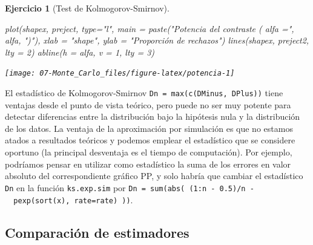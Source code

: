 \documentclass[
]{book}
\newenvironment{Shaded}{\begin{snugshade}}{\end{snugshade}}
\newcommand{\AttributeTok}[1]{\textcolor[rgb]{0.77,0.63,0.00}{#1}}
\newcommand{\DecValTok}[1]{\textcolor[rgb]{0.00,0.00,0.81}{#1}}
\newcommand{\FunctionTok}[1]{\textcolor[rgb]{0.00,0.00,0.00}{#1}}
\newcommand{\NormalTok}[1]{#1}
\newcommand{\StringTok}[1]{\textcolor[rgb]{0.31,0.60,0.02}{#1}}
\theoremstyle{break}
\newtheorem{exercise}{Ejercicio}[chapter]
\theoremstyle{nonumberplain}
\begin{document}
\begin{exercise}[Test de Kolmogorov-Smirnov]
\begin{enumerate}
\begin{Shaded}
\begin{Highlighting}[]
\FunctionTok{plot}\NormalTok{(shapex, preject, }\AttributeTok{type=}\StringTok{"l"}\NormalTok{, }\AttributeTok{main =} \FunctionTok{paste}\NormalTok{(}\StringTok{"Potencia del contraste ( alfa ="}\NormalTok{, alfa, }\StringTok{")"}\NormalTok{), }
     \AttributeTok{xlab =} \StringTok{"shape"}\NormalTok{, }\AttributeTok{ylab =} \StringTok{"Proporción de rechazos"}\NormalTok{)}
\FunctionTok{lines}\NormalTok{(shapex, preject2, }\AttributeTok{lty =} \DecValTok{2}\NormalTok{)}
\FunctionTok{abline}\NormalTok{(}\AttributeTok{h =}\NormalTok{ alfa, }\AttributeTok{v =} \DecValTok{1}\NormalTok{, }\AttributeTok{lty =} \DecValTok{3}\NormalTok{)}
\end{Highlighting}
\end{Shaded}

  \begin{center}\texttt{[image: 07-Monte\_Carlo\_files/figure-latex/potencia-1]} \end{center}
\end{enumerate}

\end{exercise}

El estadístico de Kolmogorov-Smirnov \texttt{Dn\ =\ max(c(DMinus,\ DPlus))} tiene ventajas desde el
punto de vista teórico, pero puede no ser muy potente para detectar diferencias entre la
distribución bajo la hipótesis nula y la distribución de los datos.
La ventaja de la aproximación por simulación es que no estamos atados a resultados teóricos
y podemos emplear el estadístico que se considere oportuno
(la principal desventaja es el tiempo de computación).
Por ejemplo, podríamos pensar en utilizar como estadístico la suma de los errores en
valor absoluto del correspondiente gráfico PP, y solo habría que cambiar el estadístico
\texttt{Dn} en la función \texttt{ks.exp.sim} por \texttt{Dn\ =\ sum(abs(\ (1:n\ -\ 0.5)/n\ -\ \ pexp(sort(x),\ rate=rate)\ ))}.

\hypertarget{comparaciuxf3n-de-estimadores}{%
\subsection{Comparación de estimadores}\label{comparaciuxf3n-de-estimadores}}
\end{document}
